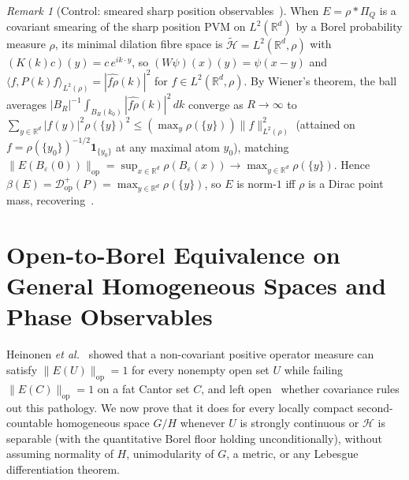 \documentclass[11pt,a4paper]{article}
\theoremstyle{definition}
\theoremstyle{remark}
\newtheorem{remark}[theorem]{Remark}
\newcommand{\HH}{\mathcal{H}}
\newcommand{\tH}{\widetilde{\mathcal{H}}}
\newcommand{\RR}{\mathbb{R}}
\newcommand{\op}{\mathrm{op}}
\newcommand{\one}{\mathbf{1}}
\newcommand{\ip}[2]{\langle #1, #2 \rangle}
\newcommand{\norm}[1]{\|#1\|}
\begin{document}
\begin{remark}[Control: smeared sharp position observables~\cite{Carmeli2004}]\label{rem:cht}
When $E = \rho * \Pi_Q$ is a covariant smearing of the sharp position PVM on $L^2(\RR^d)$ by a Borel probability measure $\rho$, its minimal dilation fibre space is $\tH = L^2(\RR^d,\rho)$ with $(K(k)c)(y) = c\,e^{ik\cdot y}$, so $(W\psi)(x)(y) = \psi(x-y)$ and $\ip{f}{P(k)f}_{L^2(\rho)} = |\widehat{f\rho}(k)|^2$ for $f\in L^2(\RR^d,\rho)$. By Wiener's theorem, the ball averages $|B_R|^{-1}\int_{B_R(k_0)}|\widehat{f\rho}(k)|^2\,dk$ converge as $R\to\infty$ to $\sum_{y\in\RR^d}|f(y)|^2\rho(\{y\})^2 \le (\max_y\rho(\{y\}))\norm{f}_{L^2(\rho)}^2$ (attained on $f=\rho(\{y_0\})^{-1/2}\one_{\{y_0\}}$ at any maximal atom $y_0$), matching $\norm{E(B_\varepsilon(0))}_{\op} = \sup_{x\in\RR^d}\rho(B_\varepsilon(x)) \to \max_{y\in\RR^d}\rho(\{y\})$. Hence $\beta(E)=\mathcal{D}_{\op}^+(P)=\max_{y\in\RR^d}\rho(\{y\})$, so $E$ is norm-$1$ iff $\rho$ is a Dirac point mass, recovering~\cite{Carmeli2004}.
\end{remark}

\section{Open-to-Borel Equivalence on General Homogeneous Spaces and Phase Observables}
\label{sec:open-borel}

Heinonen \emph{et al.}~\cite[Ex.~2]{Heinonen2003} showed that a non-covariant positive operator measure can satisfy $\norm{E(U)}_{\op}=1$ for every nonempty open set $U$ while failing $\norm{E(C)}_{\op}=1$ on a fat Cantor set $C$, and left open~\cite[Sec.~5.1]{Heinonen2003} whether covariance rules out this pathology. We now prove that it does for every locally compact second-countable homogeneous space $G/H$ whenever $U$ is strongly continuous or $\HH$ is separable (with the quantitative Borel floor holding unconditionally), without assuming normality of $H$, unimodularity of $G$, a metric, or any Lebesgue differentiation theorem.
\end{document}
